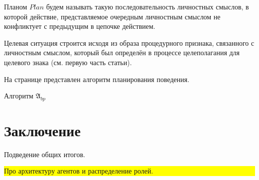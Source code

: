 \documentclass[a4paper, 12pt]{article}
\theoremstyle{plain}
\begin{document}
	Планом $Plan$ будем называть такую последовательность личностных смыслов, в которой действие, представляемое очередным личностным смыслом не конфликтует с предыдущим в цепочке действием.
	
	Целевая ситуация строится исходя из образа процедурного признака, связанного с личностным смыслом, который был определён в процессе целеполагания для целевого знака (см. первую часть статьи).
	
	На странице \pageref{alg:beh_plan} представлен алгоритм планирования поведения.
	\begin{algorithm}
		\caption{Алгоритм $\mathfrak{A}_{bp}$}\label{alg:beh_plan}
		\begin{algorithmic}[1]
			
		\end{algorithmic}
	\end{algorithm}
	
	\section*{Заключение} Подведение общих итогов.
	
	\noindent\colorbox{yellow}{
		\parbox{\dimexpr\linewidth-2\fboxsep}{Про архитектуру агентов и распределение ролей.}
	}
	
	
	
\end{document}
